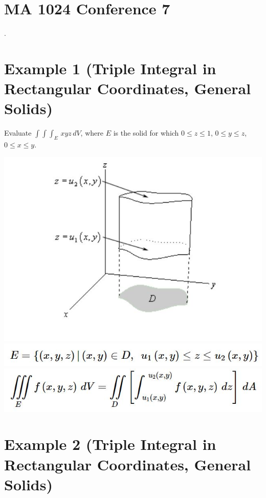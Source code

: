 \documentclass[11pt]{article}
\begin{document}
\section*{MA 1024 Conference 7}

\vspace{\baselineskip}
\vspace{\baselineskip}
.

\newpage


\section*{Example 1 (Triple Integral in Rectangular Coordinates, General Solids)}

Evaluate $\int \int \int_E \, xyz\, dV$, where $E$ is the solid for which $0\leq z \leq 1$, $0\leq y \leq z$, $0 \leq x \leq y$.

\newpage
\includegraphics{Capture1.jpg}\\
\includegraphics{Capture2.jpg}\\
\includegraphics{Capture3.jpg}
\section*{Example 2 (Triple Integral in Rectangular Coordinates, General Solids)}
\end{document}
